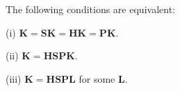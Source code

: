 The following conditions are equivalent:

(i) $\mathbf{K} = \mathbf{SK} = \mathbf{HK} = \mathbf{PK}$.

(ii) $\mathbf{K} = \mathbf{HSPK}$.

(iii) $\mathbf{K} = \mathbf{HSPL}$ for some $\mathbf{L}$.
